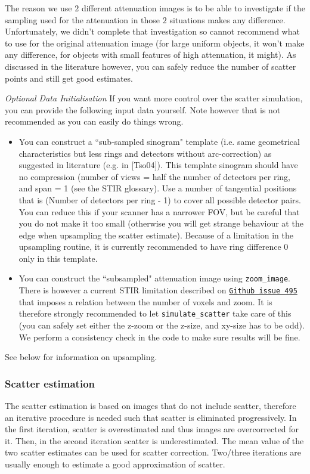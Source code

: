 \documentclass{article}
\def\url#1#2{\mbox{\href{#1}{\tt #2}}}
\begin{document}
The reason we use $2$ different attenuation images is to be able to investigate if the sampling used for
the attenuation in those $2$ situations makes any difference. Unfortunately, we didn't complete that
investigation so cannot recommend what to use for the original attenuation image (for large uniform
objects, it won't make any difference, for objects with small features of high attenuation, it might). 
As discussed in the literature however, you can safely reduce the number of scatter points and still get
good estimates.

\textit{Optional Data Initialisation}
If you want more control over the scatter simulation, you can provide the following input data yourself. Note
however that is not recommended as you can easily do things wrong.
\begin{itemize}
\item You can construct a ``sub-sampled sinogram" template (i.e. same geometrical characteristics but
less rings and detectors without arc-correction) as suggested in literature (e.g. in [Tso04]). This template
sinogram should have no compression (number of views = half the number of detectors per ring, and span = 1 (see the
STIR glossary). 
Use a number of tangential positions that is (Number of detectors per ring - 1) to cover all possible
detector pairs. You can reduce this if your scanner has a narrower FOV, but be careful that you do not 
make it too small (otherwise you will get strange behaviour at the edge when upsampling the scatter estimate).
Because of a limitation in the upsampling routine, it is currently recommended to have ring difference 0 only in this
template.
\item You can construct the ``subsampled" attenuation image using \texttt{zoom\_image}. 
  There is however a current STIR limitation described on \url{https://github.com/UCL/STIR/issues/495}{Github issue 495}
  that imposes a relation between the number of voxels and zoom. It is therefore strongly recommended to let
  \texttt{simulate\_scatter} take care of this (you can safely set either the z-zoom or the z-size, and xy-size has to be odd).
  We perform a consistency check in the code to make sure results will be fine.
\end{itemize}

See below for information on upsampling.

\subsubsection{Scatter estimation}
The scatter estimation is based on images that do not include scatter, therefore an iterative procedure
is needed such that scatter is eliminated progressively. In the first iteration, scatter is
overestimated and thus images are overcorrected for it. Then, in the second iteration scatter
is underestimated. The mean value of the two scatter estimates can be used for scatter correction. Two/three
iterations are usually enough to estimate a good approximation of scatter.
\end{document}
